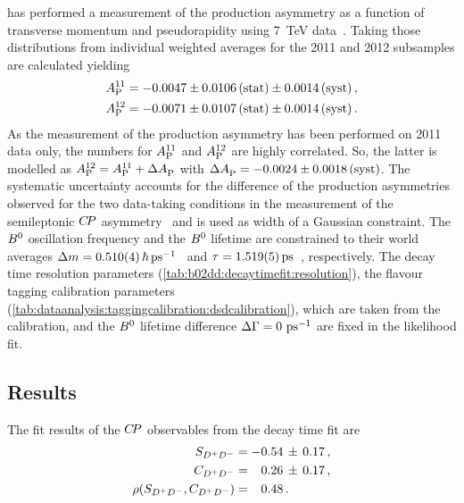 \lhcb has performed a measurement of the production asymmetry as a function
of transverse momentum and pseudorapidity using \SI{7}{\TeV}
data~\cite{LHCb-PAPER-2014-042}. Taking those distributions from \BdToDD
individual weighted averages for the 2011 and 2012 subsamples are calculated
yielding
%
\begin{equation}
  \begin{split}
    A_\text{P}^{11} &= -0.0047 \pm 0.0106 \,\text{(stat)} \pm 0.0014 \, \text{(syst)} \,, \\
    A_\text{P}^{12} &= -0.0071 \pm 0.0107 \,\text{(stat)} \pm 0.0014 \, \text{(syst)} \,.
  \end{split}
\end{equation}
%
As the measurement of the production asymmetry has been performed on 2011 data
only, the numbers for $A_\text{P}^{11}$ and $A_\text{P}^{12}$ are highly
correlated. So, the latter is modelled as $A_\text{P}^{12} = A_\text{P}^{11} +
\Delta A_\text{P}^{}$ with $\Delta A_\text{P}^{} = -0.0024 \pm 0.0018
\,\text{(syst)}$. The systematic uncertainty accounts for the difference of
the production asymmetries observed for the two data-taking conditions in the
measurement of the semileptonic ${C\!P}$ asymmetry~\cite{LHCb-PAPER-2014-053} and
is used as width of a Gaussian constraint. The ${{B}^0}$ oscillation frequency and
the ${{B}^0}$ lifetime are constrained to their world averages $\dm =
\SI{0.510\pm0.004}{\planckbar\invps}$~\cite{HFAG} and $\tau =
\SI{1.519\pm0.005}{\ps}$~\cite{PDG2014}, respectively. The decay time
resolution parameters (\cref{tab:b02dd:decaytimefit:resolution}), the flavour
tagging calibration parameters
(\cref{tab:dataanalysis:taggingcalibration:dsdcalibration}), which are taken
from the \BdToDsD calibration, and the ${{B}^0}$ lifetime difference ${\Delta\Gamma} =
\SI{0}{\ensuremath{{\mathrm{ \,ps^{-1}}}}}$ are fixed in the likelihood fit.

\subsection{Results}

The fit results of the ${C\!P}$ observables from the decay time fit are
\begin{align}
\begin{split}
  S_{{{D}^+}{{D}^-}}                &= -0.54\,\pm\,0.17 \, , \\
  C_{{{D}^+}{{D}^-}}                &= \phantom{-}0.26\,\pm\,0.17 \, , \\
  \rho(S_{{{D}^+}{{D}^-}},C_{{{D}^+}{{D}^-}})     &= \phantom{-}0.48 \, . \\
\end{split}
\label{eq:b02dd:decaytimefit:cpresults}
\end{align}

